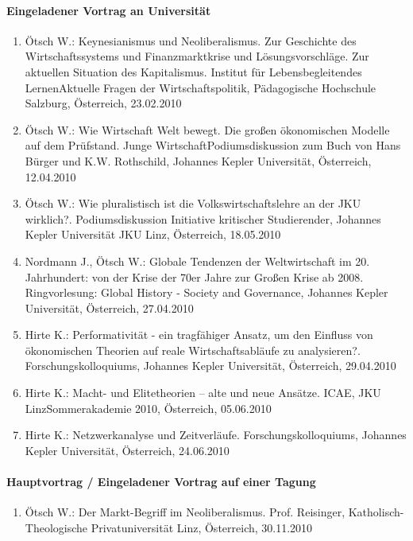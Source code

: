 \paragraph{Eingeladener Vortrag an Universität}
\begin{enumerate}
	\item Ötsch W.: Keynesianismus und Neoliberalismus. Zur Geschichte des Wirtschaftssystems und Finanzmarktkrise und Lösungsvorschläge. Zur aktuellen Situation des Kapitalismus. Institut für Lebensbegleitendes LernenAktuelle Fragen der Wirtschaftspolitik, Pädagogische Hochschule Salzburg, Österreich, 23.02.2010
	\item Ötsch W.: Wie Wirtschaft Welt bewegt. Die großen ökonomischen Modelle auf dem Prüfstand. Junge WirtschaftPodiumsdiskussion zum Buch von Hans Bürger und K.W. Rothschild, Johannes Kepler Universität, Österreich, 12.04.2010
	\item Ötsch W.: Wie pluralistisch ist die Volkswirtschaftslehre an der JKU wirklich?. Podiumsdiskussion Initiative kritischer Studierender, Johannes Kepler Universität JKU Linz, Österreich, 18.05.2010
	\item Nordmann J., Ötsch W.: Globale Tendenzen der Weltwirtschaft im 20. Jahrhundert: von der Krise der 70er Jahre zur Großen Krise ab 2008. Ringvorlesung: Global History - Society and Governance, Johannes Kepler Universität, Österreich, 27.04.2010
	\item Hirte K.: Performativität - ein tragfähiger Ansatz, um den Einfluss von ökonomischen Theorien auf reale Wirtschaftsabläufe zu analysieren?. Forschungskolloquiums, Johannes Kepler Universität, Österreich, 29.04.2010
	\item Hirte K.: Macht- und Elitetheorien – alte und neue Ansätze. ICAE, JKU LinzSommerakademie 2010, Österreich, 05.06.2010
	\item Hirte K.: Netzwerkanalyse und Zeitverläufe. Forschungskolloquiums, Johannes Kepler Universität, Österreich, 24.06.2010
\end{enumerate}
\paragraph{Hauptvortrag / Eingeladener Vortrag auf einer Tagung}
\begin{enumerate}
	\item Ötsch W.: Der Markt-Begriff im Neoliberalismus. Prof. Reisinger, Katholisch-Theologische Privatuniversität Linz, Österreich, 30.11.2010
\end{enumerate}
